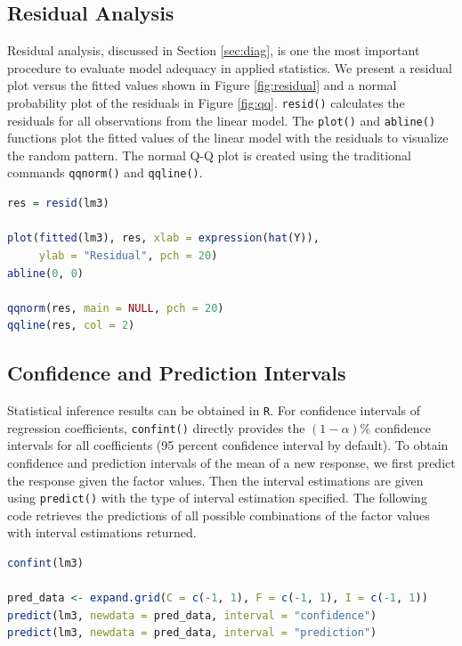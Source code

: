 \documentclass[11pt]{article}
\begin{document}
\subsection{Residual Analysis}\label{app:residual}
Residual analysis, discussed in Section \ref{sec:diag}, is one the most important procedure to evaluate model adequacy in applied statistics. We present a residual plot versus the fitted values shown in Figure \ref{fig:residual} and a normal probability plot of the residuals in Figure \ref{fig:qq}. \texttt{resid()} calculates the residuals for all observations from the linear model. The \texttt{plot()} and \texttt{abline()} functions plot the fitted values of the linear model with the residuals to visualize the random pattern. The normal Q-Q plot is created using the traditional commands \texttt{qqnorm()} and \texttt{qqline()}.
\begin{file}[dae.r]
\begin{lstlisting}[language = R]
res = resid(lm3)

plot(fitted(lm3), res, xlab = expression(hat(Y)), 
     ylab = "Residual", pch = 20)
abline(0, 0)

qqnorm(res, main = NULL, pch = 20)
qqline(res, col = 2)
\end{lstlisting}
\end{file}

\subsection{Confidence and Prediction Intervals}\label{app:si}
Statistical inference results can be obtained in \texttt{R}. For confidence intervals of regression coefficients, \texttt{confint()} directly provides the $(1-\alpha)\%$ confidence intervals for all coefficients (95 percent confidence interval by default). To obtain confidence and prediction intervals of the mean of a new response, we first predict the response given the factor values. Then the interval estimations are given using \texttt{predict()} with the type of interval estimation specified. The following code retrieves the predictions of all possible combinations of the factor values with interval estimations returned. 
\begin{file}[dae.r]
\begin{lstlisting}[language = R]
confint(lm3)

pred_data <- expand.grid(C = c(-1, 1), F = c(-1, 1), I = c(-1, 1))
predict(lm3, newdata = pred_data, interval = "confidence")
predict(lm3, newdata = pred_data, interval = "prediction")
\end{lstlisting}
\end{file}



\end{document}
